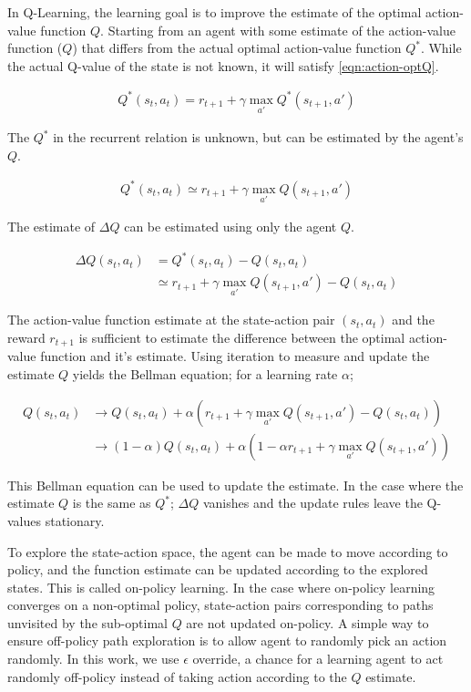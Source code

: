 \documentclass[../dissertation.tex]{subfiles}
\begin{document}
In Q-Learning, the learning goal is to improve the estimate of the optimal action-value function $Q$.
Starting from an agent with some estimate of the action-value function ($Q$) that differs from the actual optimal action-value function $Q^*$.
While the actual Q-value of the state is not known, it will satisfy \cref{eqn:action-optQ}.

\begin{align}
    \label{eqn:qlrnOpt}
    Q^* (s_t, a_t) = r_{t+1} + \gamma \max_{a'} Q^* (s_{t+1}, a')
\end{align}

The $Q^*$ in the recurrent relation is unknown, but can be estimated by the agent's $Q$.

\begin{align}
    \label{eqn:qlrnOptEst}
    Q^* (s_t, a_t) \simeq  r_{t+1} + \gamma \max_{a'} Q (s_{t+1}, a')
\end{align}

The estimate of $\Delta Q$ can be estimated using only the agent $Q$.

\begin{align}
    \label{eqn:qlrnDelQ}
    \Delta Q (s_t, a_t) & = Q^* (s_t, a_t) - Q (s_t, a_t) \\
                        & \simeq r_{t+1} + \gamma \max_{a'} Q (s_{t+1}, a') - Q (s_t, a_t)
\end{align}

The action-value function estimate at the state-action pair $(s_t, a_t)$ and the reward $r_{t+1}$ is sufficient to estimate the difference between the optimal action-value function and it's estimate.
Using iteration to measure and update the estimate $Q$ yields the Bellman equation; for a learning rate $\alpha$;

\begin{align}
    \label{eqn:bellman-qlearn}
    Q(s_t, a_t) & \rightarrow Q(s_t, a_t) + \alpha \left( r_{t+1} + \gamma \max_{a'} Q (s_{t+1}, a') - Q (s_t, a_t) \right) \\
                & \rightarrow \left( 1 - \alpha \right) Q(s_t, a_t) + \alpha \left( 1 - \alpha r_{t+1} + \gamma \max_{a'} Q (s_{t+1}, a') \right)
\end{align}

This Bellman equation can be used to update the estimate.
In the case where the estimate $Q$ is the same as $Q^*$; $\Delta Q$ vanishes and the update rules leave the Q-values stationary.

To explore the state-action space, the agent can be made to move according to policy, and the function estimate can be updated according to the explored states.
This is called on-policy learning.
In the case where on-policy learning converges on a non-optimal policy, state-action pairs corresponding to paths unvisited by the sub-optimal $Q$ are not updated on-policy.
A simple way to ensure off-policy path exploration is to allow agent to randomly pick an action randomly.
In this work, we use $\epsilon$ override, a chance for a learning agent to act randomly off-policy instead of taking action according to the $Q$ estimate.
\end{document}
